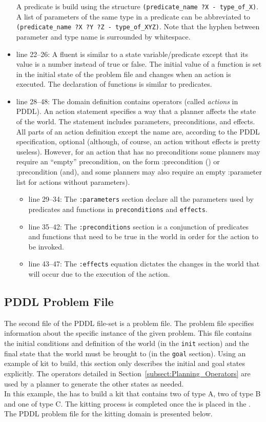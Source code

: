 \begin{itemize}
    A predicate is build using the structure \texttt{(predicate\_name ?X - type\_of\_X)}. A list of parameters of the same type in a predicate can be abbreviated to \texttt{(predicate\_name ?X ?Y ?Z - type\_of\_XYZ)}. Note that the hyphen between parameter and type name is surrounded by whitespace.
\item line 22--26: A fluent is similar to a state variable/predicate except that its value is a number instead of true or false. The initial value of a function is set in the initial state of the problem file and changes when an action is executed. The declaration of functions is similar to predicates.
\item line 28--48: The domain definition contains operators (called \textit{actions} in PDDL). An action statement specifies a way that a planner affects the state of the world. The statement includes parameters, preconditions, and effects. All parts of an action definition except the name are, according to the PDDL specification, optional (although, of course, an action without effects is pretty useless). However, for an action that has no preconditions some planners may require an ``empty'' precondition, on the form :precondition () or :precondition (and), and some planners may also require an empty :parameter list for actions without parameters).
\begin{itemize}
\item line 29--34: The \texttt{:parameters} section declare all the parameters used by predicates and functions in \texttt{preconditions} and \texttt{effects}.
\item line 35--42:  The \texttt{:preconditions} section is a conjunction of predicates and functions that need to be true in the world in order for the action to be invoked.
\item line 43--47: The \texttt{:effects} equation dictates the changes in the world that will occur due to the execution of the action.
\end{itemize}
\end{itemize}


\subsection{PDDL Problem File}\label{S:PDDL-problem}
The second file of the PDDL file-set is a  problem file. The problem file specifies information about the specific instance of the given problem. This file contains the initial conditions and definition of the world (in the \texttt{init} section) and the final state that the world must be brought to (in the \texttt{goal} section). Using an example of kit to build, this section only describes the initial and goal states explicitly. The operators detailed in Section~\ref{subsect:Planning_Operators} are used by a planner to generate the other states as needed.\\
In this example, the  has to build a kit that contains two  of type A, two  of type B and one  of type C. The kitting process is completed once the  is placed in the . The PDDL problem file for the kitting domain is presented below.

